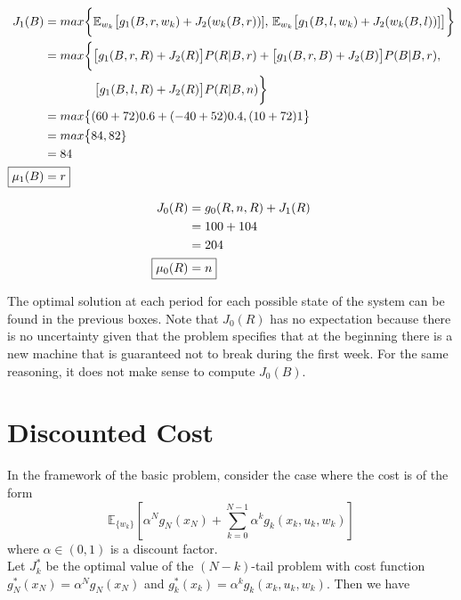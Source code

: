 \documentclass[11pt, oneside]{article}   	%
\begin{document}
\begin{align*}
J_{1}(B) &= max \bigg\{ \mathbb{E}_{w_{k}} \big[ g_{1}(B,r,w_{k}) + J_{2}(w_{k}(B,r))], \, \mathbb{E}_{w_{k}} \big[ g_{1}(B,l,w_{k}) + J_{2}(w_{k}(B,l))] \big] \bigg\}\\
&= max \bigg\{ \big[g_{1}(B,r,R) + J_{2}(R)\big]P(R|B,r) + \big[g_{1}(B,r,B) + J_{2}(B)\big]P(B|B,r),\\
& \quad \quad \quad \quad \, \big[g_{1}(B,l,R) + J_{2}(R)\big]P(R|B,n) \bigg\}\\
&= max \big\{ (60+72)0.6+(-40+52)0.4, (10+72)1 \big\}\\
&= max \big\{84,82\}\\
&= 84\\
\Aboxed{\mu_{1}(B)&=r}\\
\end{align*}

\begin{align*}
J_{0}(R) &= g_{0}(R,n,R) + J_{1}(R)\\
&= 100 + 104\\\
&= 204\\
\Aboxed{\mu_{0}(R)&=n}\\
\end{align*}

The optimal solution at each period for each possible state of the system can be found in the previous boxes. Note that $J_{0}(R)$ has no expectation because there is no uncertainty given that the problem specifies that at the beginning there is a new machine that is guaranteed not to break during the first week. For the same reasoning, it does not make sense to compute $J_{0}(B)$.

\section{Discounted Cost}
In the framework of the basic problem, consider the case where the cost is of the form $$\mathbb{E}_{\{w_k\}}[\alpha^N g_N(x_N) + \sum_{k=0}^{N-1} \alpha^k g_k(x_k, u_k, w_k)]$$ where $\alpha \in (0,1)$ is a discount factor. \\

Let $J^{*}_{k}$ be the optimal value of the $(N-k)$-tail problem with cost function $g^{*}_N (x_N) = \alpha^N g_N(x_N)$ and $g^{*}_k (x_k) = \alpha^k g_k(x_k, u_k, w_k)$. Then we have
\end{document}
